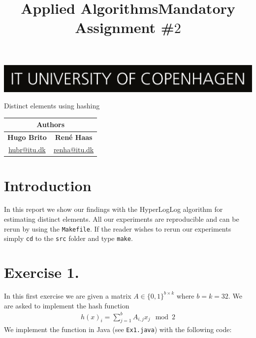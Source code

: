 \documentclass{tufte-handout}
\title{Applied Algorithms\newline Mandatory Assignment \#$2$}
\begin{document}
\thispagestyle{empty}

\maketitle
\includegraphics[width=\textwidth]{figs/logo_en.png}

\vspace{10mm}\noindent %

\begin{center}
{\LARGE Distinct elements using hashing}
\end{center}

\vspace{5mm}\noindent %

\begin{table}[!h]
\centering
\begin{tabular}{cc}
\multicolumn{2}{c}{Authors}                                   \\ \hline
\multicolumn{1}{c|}{\textbf{Hugo Brito}} & \textbf{René Haas} \\
\multicolumn{1}{c|}{\href{mailto:hubr@itu.dk}{hubr@itu.dk}}         & \href{mailto:renha@itu.dk}{renha@itu.dk}       \\ \hline
\end{tabular}
\end{table}

\vspace{5mm} %


\section{Introduction}

In this report we show our findings with the HyperLogLog algorithm for estimating distinct elements.
All our experiments are reproducible and can be rerun by using the {\tt Makefile}. If the reader wishes to rerun our experiments simply {\tt cd} to the {\tt src} folder and type {\tt make}.

\section{\textbf{Exercise 1.}}
In this first exercise we are given a matrix $A\in\{0,1\}^{b\times k}$ where $b=k=32$. We are asked to implement the hash function
\begin{align*}
  h(x)_i = \sum_{j=1}^b A_{i,j}x_j \mod 2
\end{align*}
We implement the function in Java (see {\tt Ex1.java})
with the following code:
\end{document}
